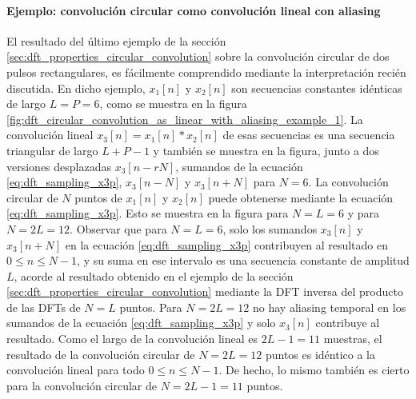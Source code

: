 \documentclass[a4paper]{report}
\begin{document}
\paragraph{Ejemplo: convolución circular como convolución lineal con aliasing} El resultado del último ejemplo de la sección \ref{sec:dft_properties_circular_convolution} sobre la convolución circular de dos pulsos rectangulares, es fácilmente comprendido mediante la interpretación recién discutida. En dicho ejemplo, \(x_1[n]\) y \(x_2[n]\) son secuencias constantes idénticas de largo \(L=P=6\), como se muestra en la figura \ref{fig:dft_circular_convolution_as_linear_with_aliasing_example_1}. La convolución lineal \(x_3[n]=x_1[n]*x_2[n]\) de esas secuencias es una secuencia triangular de largo \(L+P-1\) y también se muestra en la figura, junto a dos versiones desplazadas \(x_3[n-rN]\), sumandos de la ecuación \ref{eq:dft_sampling_x3p}, \(x_3[n-N]\) y \(x_3[n+N]\) para \(N=6\). La convolución circular de \(N\) puntos de \(x_1[n]\) y \(x_2[n]\) puede obtenerse mediante la ecuación \ref{eq:dft_sampling_x3p}. Esto se muestra en la figura para \(N=L=6\) y para \(N=2L=12\). Observar que para \(N=L=6\), solo los sumandos \(x_3[n]\) y \(x_3[n+N]\) en la ecuación \ref{eq:dft_sampling_x3p} contribuyen al resultado en \(0\leq n\leq N-1\), y su suma en ese intervalo es una secuencia constante de amplitud \(L\), acorde al resultado obtenido en el ejemplo de la sección \ref{sec:dft_properties_circular_convolution} mediante la DFT inversa del producto de las DFTs de \(N=L\) puntos. Para \(N=2L=12\) no hay aliasing temporal en los sumandos de la ecuación \ref{eq:dft_sampling_x3p} y solo \(x_3[n]\) contribuye al resultado. Como el largo de la convolución lineal es \(2L-1=11\) muestras, el resultado de la convolución circular de \(N=2L=12\) puntos es idéntico a la convolución lineal para todo \(0\leq n\leq N-1\). De hecho, lo mismo también es cierto para la convolución circular de \(N=2L-1=11\) puntos.
\end{document}
